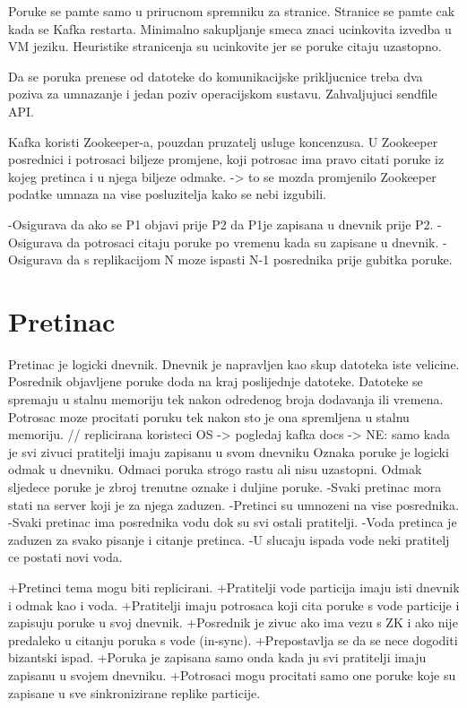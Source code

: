 \documentclass[times, utf8, diplomski, numeric]{fer}
\begin{document}
Poruke se pamte samo u prirucnom spremniku za stranice.
Stranice se pamte cak kada se Kafka restarta.
Minimalno sakupljanje smeca znaci ucinkovita izvedba u VM jeziku.
Heuristike stranicenja su ucinkovite jer se poruke citaju uzastopno.

Da se poruka prenese od datoteke do komunikacijske prikljucnice treba dva poziva za umnazanje i jedan poziv operacijskom sustavu.
Zahvaljujuci sendfile API.

Kafka koristi Zookeeper-a, pouzdan pruzatelj usluge koncenzusa.
U Zookeeper posrednici i potrosaci biljeze promjene, koji potrosac ima pravo citati poruke iz kojeg pretinca i u njega biljeze odmake. -> to se mozda promjenilo
Zookeeper podatke umnaza na vise posluzitelja kako se nebi izgubili.

-Osigurava da ako se P1 objavi prije P2 da P1je zapisana u dnevnik prije P2.
-Osigurava da potrosaci citaju poruke po vremenu kada su zapisane u dnevnik.
-Osigurava da s replikacijom N moze ispasti N-1 posrednika prije gubitka poruke.



\chapter{Pretinac}
Pretinac je logicki dnevnik.
Dnevnik je napravljen kao skup datoteka iste velicine.
Posrednik objavljene poruke doda na kraj poslijednje datoteke.
Datoteke se spremaju u stalnu memoriju tek nakon odredenog broja dodavanja ili vremena.
Potrosac moze procitati poruku tek nakon sto je ona spremljena u stalnu memoriju. // replicirana koristeci OS -> pogledaj kafka docs -> NE: samo kada je svi zivuci pratitelji imaju zapisanu u svom dnevniku
Oznaka poruke je logicki odmak u dnevniku.
Odmaci poruka strogo rastu ali nisu uzastopni.
Odmak sljedece poruke je zbroj trenutne oznake i duljine poruke.
-Svaki pretinac mora stati na server koji je za njega zaduzen.
-Pretinci su umnozeni na vise posrednika.
-Svaki pretinac ima posrednika vodu dok su svi ostali pratitelji.
-Voda pretinca je zaduzen za svako pisanje i citanje pretinca.
-U slucaju ispada vode neki pratitelj ce postati novi voda.

+Pretinci tema mogu biti replicirani.
+Pratitelji vode particija imaju isti dnevnik i odmak kao i voda.
+Pratitelji imaju potrosaca koji cita poruke s vode particije i zapisuju poruke u svoj dnevnik.
+Posrednik je zivuc ako ima vezu s ZK i ako nije predaleko u citanju poruka s vode (in-sync).
+Prepostavlja se da se nece dogoditi bizantski ispad.
+Poruka je zapisana samo onda kada ju svi pratitelji imaju zapisanu u svojem dnevniku.
+Potrosaci mogu procitati samo one poruke koje su zapisane u sve sinkronizirane replike particije.
\end{document}
